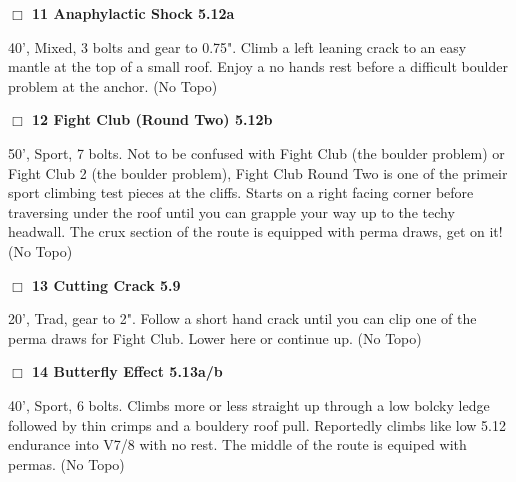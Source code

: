 \begin{multicols}{2}
\needspace{1.5cm}
\label{rt:Anaphylactic Shock}
\colorbox{Goldenrod!20}{
\parbox{0.95\linewidth}{
\hspace{-1ex}\textbf{$\Box$
11 Anaphylactic Shock 5.12a  
}}}
\begin{adjustwidth}{1.3em}{}			
40', Mixed, 3 bolts and gear to 0.75". Climb a left leaning crack to an easy mantle at the top of a small roof. Enjoy a no hands rest before a difficult boulder problem at the anchor.
  (No Topo)
\end{adjustwidth}




\needspace{1.5cm}
\label{rt:Fight Club (Round Two)}
\colorbox{Goldenrod!20}{
\parbox{0.95\linewidth}{
\hspace{-1ex}\textbf{$\Box$
12 Fight Club (Round Two) 5.12b  
}}}
\begin{adjustwidth}{1.3em}{}			
50', Sport, 7 bolts. Not to be confused with Fight Club (the boulder problem) or Fight Club 2 (the boulder problem), Fight Club Round Two is one of the primeir sport climbing test pieces at the cliffs. Starts on a right facing corner before traversing under the roof until you can grapple your way up to the techy headwall. The crux section of the route is equipped with perma draws, get on it!
  (No Topo)
\end{adjustwidth}




\needspace{1.5cm}
\label{rt:Cutting Crack}
\colorbox{green!20}{
\parbox{0.95\linewidth}{
\hspace{-1ex}\textbf{$\Box$
13 Cutting Crack 5.9  
}}}
\begin{adjustwidth}{1.3em}{}			
20', Trad, gear to 2". Follow a short hand crack until you can clip one of the perma draws for Fight Club. Lower here or continue up.
  (No Topo)
\end{adjustwidth}




\needspace{1.5cm}
\label{rt:Butterfly Effect}
\colorbox{Goldenrod!20}{
\parbox{0.95\linewidth}{
\hspace{-1ex}\textbf{$\Box$
14 Butterfly Effect 5.13a/b  
}}}
\begin{adjustwidth}{1.3em}{}			
40', Sport, 6 bolts. Climbs more or less straight up through a low bolcky ledge followed by thin crimps and a bouldery roof pull. Reportedly climbs like low 5.12 endurance into V7/8 with no rest. The middle of the route is equiped with permas.
  (No Topo)
\end{adjustwidth}





\end{multicols}

